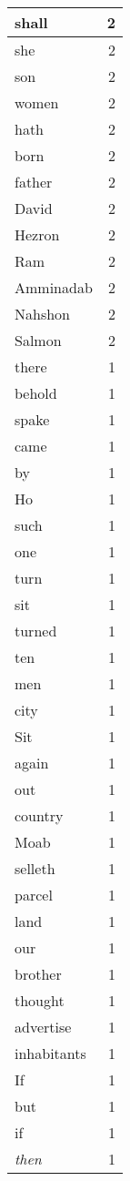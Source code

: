 \begin{center}
\begin{longtable}{l|r}
shall & 2 \\ \hline
she & 2 \\ \hline
son & 2 \\ \hline
women & 2 \\ \hline
hath & 2 \\ \hline
born & 2 \\ \hline
father & 2 \\ \hline
David & 2 \\ \hline
Hezron & 2 \\ \hline
Ram & 2 \\ \hline
Amminadab & 2 \\ \hline
Nahshon & 2 \\ \hline
Salmon & 2 \\ \hline
there & 1 \\ \hline
behold & 1 \\ \hline
spake & 1 \\ \hline
came & 1 \\ \hline
by & 1 \\ \hline
Ho & 1 \\ \hline
such & 1 \\ \hline
one & 1 \\ \hline
turn & 1 \\ \hline
sit & 1 \\ \hline
turned & 1 \\ \hline
ten & 1 \\ \hline
men & 1 \\ \hline
city & 1 \\ \hline
Sit & 1 \\ \hline
again & 1 \\ \hline
out & 1 \\ \hline
country & 1 \\ \hline
Moab & 1 \\ \hline
selleth & 1 \\ \hline
parcel & 1 \\ \hline
land & 1 \\ \hline
our & 1 \\ \hline
brother & 1 \\ \hline
thought & 1 \\ \hline
advertise & 1 \\ \hline
inhabitants & 1 \\ \hline
If & 1 \\ \hline
but & 1 \\ \hline
if & 1 \\ \hline
\emph{then} & 1 \\ \hline

\end{longtable}
\end{center}
